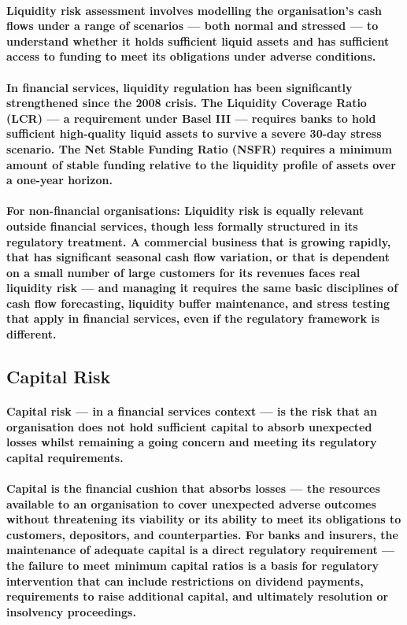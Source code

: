 \paragraph{\textbf{Liquidity risk assessment} involves modelling the organisation's cash flows under a range of scenarios — both normal and stressed — to understand whether it holds sufficient liquid assets and has sufficient access to funding to meet its obligations under adverse conditions.}
\paragraph{In financial services, liquidity regulation has been significantly strengthened since the 2008 crisis. The \textbf{Liquidity Coverage Ratio (LCR)} — a requirement under Basel III — requires banks to hold sufficient high-quality liquid assets to survive a severe 30-day stress scenario. \textbf{The Net Stable Funding Ratio (NSFR)} requires a minimum amount of stable funding relative to the liquidity profile of assets over a one-year horizon.}
\paragraph{\textbf{For non-financial organisations}: Liquidity risk is equally relevant outside financial services, though less formally structured in its regulatory treatment. A commercial business that is growing rapidly, that has significant seasonal cash flow variation, or that is dependent on a small number of large customers for its revenues faces real liquidity risk — and managing it requires the same basic disciplines of cash flow forecasting, liquidity buffer maintenance, and stress testing that apply in financial services, even if the regulatory framework is different.}

\subsection{Capital Risk}
\paragraph{\textbf{Capital risk} — in a financial services context — is the risk that an organisation does not hold sufficient capital to absorb unexpected losses whilst remaining a going concern and meeting its regulatory capital requirements.}
\paragraph{Capital is the financial cushion that absorbs losses — the resources available to an organisation to cover unexpected adverse outcomes without threatening its viability or its ability to meet its obligations to customers, depositors, and counterparties. For banks and insurers, the maintenance of adequate capital is a direct regulatory requirement — the failure to meet minimum capital ratios is a basis for regulatory intervention that can include restrictions on dividend payments, requirements to raise additional capital, and ultimately resolution or insolvency proceedings.}

